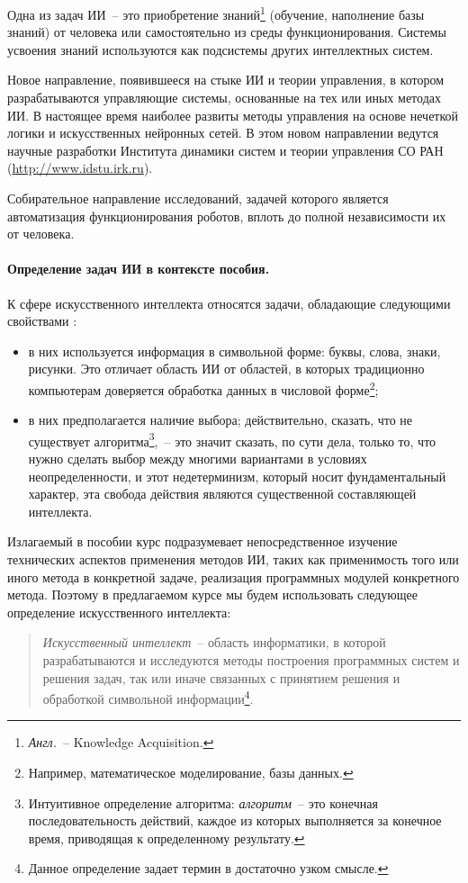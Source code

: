 \documentclass[a4paper,14pt, openany, twoside, final]{extbook} %
\begin{document}
\begin{description}[style=unboxed,leftmargin=0pt,labelindent=\parindent]
 \item [Восприятие и усвоение знаний.] Одна из задач ИИ~-- это приобретение знаний\footnote{\emph{Англ.}~-- Knowledge Acquisition.} (обучение, наполнение базы знаний) от человека или самостоятельно из среды функционирования. Системы усвоения знаний используются как подсистемы других интеллектных систем.
 \item [Интеллектное управление \cite{Vass:2000}.] Новое направление, появившееся на стыке ИИ и теории управления, в котором разрабатываются управляющие системы, основанные на тех или иных методах ИИ. В настоящее время наиболее развиты методы управления на основе нечеткой логики и искусственных нейронных сетей. В этом новом направлении ведутся научные разработки Института динамики систем и теории управления СО РАН (\url{http://www.idstu.irk.ru}).
\item [Робототехника (Robotics).] Собирательное направление исследований, задачей которого является автоматизация функционирования роботов, вплоть до полной независимости их от человека.
\end{description}

\paragraph{Определение задач ИИ в контексте пособия.} К сфере искусственного интеллекта относятся задачи, обладающие следующими свойствами \cite{Lauriere}:
 \begin{itemize}
 \item в них используется информация в символьной форме: буквы, слова, знаки, рисунки. Это отличает область ИИ от областей, в которых традиционно компьютерам доверяется обработка данных в числовой форме\footnote{Например, математическое моделирование, базы данных.};
  \item в них предполагается наличие выбора; действительно, сказать, что не существует алгоритма\footnote{Интуитивное определение алгоритма: \emph{алгоритм}~-- это конечная последовательность действий, каждое из которых выполняется за конечное время, приводящая к определенному результату.},~-- это значит сказать, по сути дела, только то, что нужно сделать выбор между многими вариантами в условиях неопределенности, и этот недетерминизм, который носит фундаментальный характер, эта свобода действия являются существенной составляющей интеллекта.
 \end{itemize}

Излагаемый в пособии курс подразумевает непосредственное изучение технических аспектов применения методов ИИ, таких как применимость того или иного метода в конкретной задаче, реализация программных модулей конкретного метода. Поэтому в предлагаемом курсе мы будем использовать следующее определение искусственного интеллекта:
\begin{quote}{\em
Искусственный интеллект}~-- область информатики, в которой разрабатываются и исследуются методы построения программных систем и решения задач, так или иначе связанных с принятием решения и обработкой символьной информации\footnote{Данное определение задает термин в достаточно узком смысле.}.
\end{quote}
\end{document}
